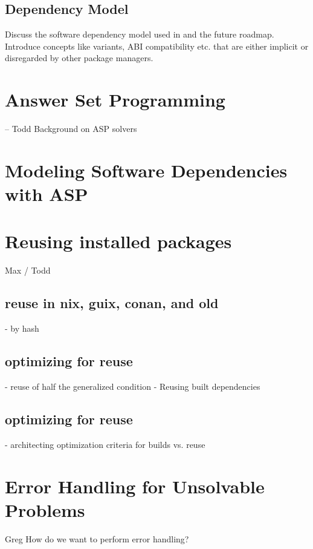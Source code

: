 \subsection{Dependency Model}
Discuss the software dependency model used in \spack and the future roadmap. Introduce concepts like variants, ABI compatibility etc. that are either implicit or disregarded by other package managers.


\section{Answer Set Programming}
-- Todd
Background on ASP solvers

\section{Modeling Software Dependencies with ASP}
\label{sec:asp-model}




\section{Reusing installed packages}
Max / Todd
\subsection{reuse in nix, guix, conan, and old \spack}
- by hash

\subsection{optimizing for reuse}
- reuse of half the generalized condition
- Reusing built dependencies

\subsection{optimizing for reuse}
- architecting optimization criteria for builds vs. reuse

\section{Error Handling for Unsolvable Problems}
Greg
How do we want to perform error handling?


